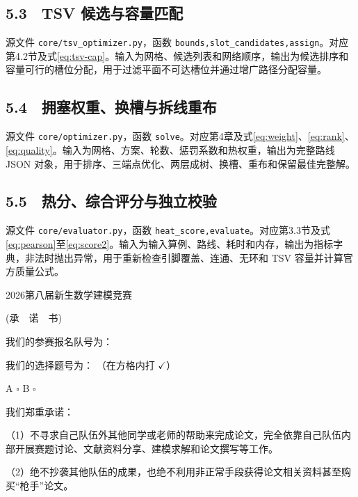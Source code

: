 \documentclass[12pt,a4paper]{article}
\begin{document}
\subsection{5.3　TSV 候选与容量匹配}
源文件 \texttt{core/tsv\_optimizer.py}，函数 \texttt{bounds,\allowbreak slot\_candidates,\allowbreak assign}。对应第4.2节及式\eqref{eq:tsv-cap}。输入为网格、候选列表和网络顺序，输出为候选排序和容量可行的槽位分配，用于过滤平面不可达槽位并通过增广路径分配容量。

\subsection{5.4　拥塞权重、换槽与拆线重布}
源文件 \texttt{core/optimizer.py}，函数 \texttt{solve}。对应第4章及式\eqref{eq:weight}、\eqref{eq:rank}、\eqref{eq:quality}。输入为网格、方案、轮数、惩罚系数和热权重，输出为完整路线 JSON 对象，用于排序、三端点优化、两层成树、换槽、重布和保留最佳完整解。

\subsection{5.5　热分、综合评分与独立校验}
源文件 \texttt{core/evaluator.py}，函数 \texttt{heat\_score,\allowbreak evaluate}。对应第3.3节及式\eqref{eq:pearson}至\eqref{eq:score2}。输入为输入算例、路线、耗时和内存，输出为指标字典，非法时抛出异常，用于重新检查引脚覆盖、连通、无环和 TSV 容量并计算官方质量公式。


\clearpage
\begin{center}
2026第八届新生数学建模竞赛

(承　诺　书)
\end{center}
\vspace{10pt}
我们的参赛报名队号为：\underline{\hspace{8cm}}

我们的选择题号为： （在方格内打 $\checkmark$）

\begin{center} A $\square$ \qquad B $\square$\end{center}
我们郑重承诺：

（1）不寻求自己队伍外其他同学或老师的帮助来完成论文，完全依靠自己队伍内部开展赛题讨论、文献资料分享、建模求解和论文撰写等工作。

（2）绝不抄袭其他队伍的成果，也绝不利用非正常手段获得论文相关资料甚至购买“枪手”论文。
\end{document}
